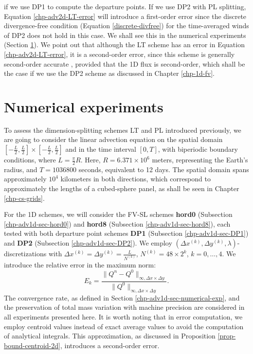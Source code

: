 if we use DP1 to compute the departure points.
If we use DP2 with PL splitting, Equation \eqref{chp-adv2d-LT-error} will introduce a first-order error since the discrete divergence-free condition (Equation \eqref{discrete-divfree})
for the time-averaged winds of DP2 does not hold in this case.
We shall see this in the numerical experiments (Section \ref{sec-ds-exp}).
We point out that although the LT scheme has an error in Equation \ref{chp-adv2d-LT-error}, it is a second-order error,
since this scheme is generally second-order accurate \citep{holden:2010}, provided that the 1D flux is second-order, 
which shall be the case if we use the DP2 scheme as discussed in Chapter \ref{chp-1d-fv}.

\section{Numerical experiments}
\label{sec-ds-exp}
To assess the dimension-splitting schemes LT and PL introduced previously, we are going to consider the linear advection 
equation on the spatial domain $[-\frac{L}{2},\frac{L}{2}]\times[-\frac{L}{2},\frac{L}{2}]$ and in the time interval $[0,T]$, 
with biperiodic boundary conditions, where $L = \frac{\pi}{2} R$. Here, $R = 6.371 \times 10^6$ meters, 
representing the Earth's radius, and $T = 1036800$ seconds, equivalent to 12 days. 
The spatial domain spans approximately $10^4$ kilometers in both directions,
which correspond to approximately the lengths of a cubed-sphere panel,
as shall be seen in Chapter \ref{chp-cs-grids}.

For the 1D schemes, we will consider the FV-SL schemes \textbf{hord0} (Subsection \ref{chp-adv1d-sec-hord0}) and
\textbf{hord8} (Subsection \ref{chp-adv1d-sec-hord8}), 
each tested with both departure point schemes \textbf{DP1} (Subsection \ref{chp-adv1d-sec-DP1}) and \textbf{DP2} (Subsection \ref{chp-adv1d-sec-DP2}).
We employ $(\Delta x^{(k)},\Delta y^{(k)},\lambda)$-discretizations with $\Delta x^{(k)} = \Delta y^{(k)} = \frac{L}{N^{(k)}}$,
$N^{(k)} = 48 \times 2^k$, $k=0,\ldots, 4$.
We introduce the relative error in the maximum norm:
\begin{equation*}
	E_k = 
	\frac{\| Q^n - Q^0 \|_{\infty, \Delta x \times \Delta y}}
	{\|Q^0\|_{\infty, \Delta x \times \Delta y}}.
\end{equation*}
The convergence rate, as defined in Section \ref{chp-adv1d-sec-numerical-exp}, and the preservation of total mass variation with 
machine precision are considered in all experiments presented here.
It is worth noting that in error computation, we employ centroid values instead of exact average values to avoid 
the computation of analytical integrals.
This approximation, as discussed in Proposition \ref{prop-bound-centroid-2d}, introduces a second-order error.

